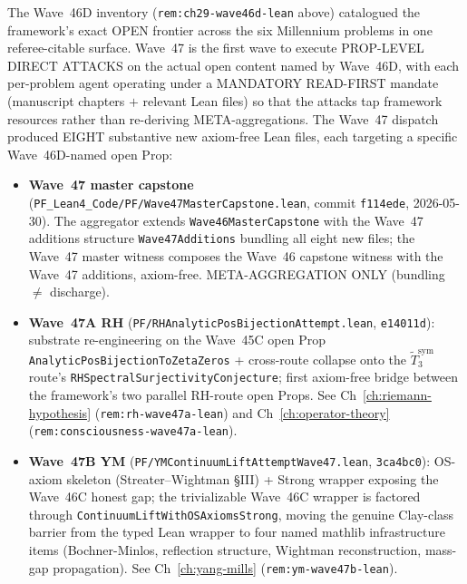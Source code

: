 \begin{remark}\label{rem:ch29-wave47-lean}
The Wave~46D inventory (\texttt{rem:ch29-wave46d-lean} above) catalogued the framework's exact OPEN frontier across the six Millennium problems in one referee-citable surface. Wave~47 is the first wave to execute PROP-LEVEL DIRECT ATTACKS on the actual open content named by Wave~46D, with each per-problem agent operating under a MANDATORY READ-FIRST mandate (manuscript chapters $+$ relevant Lean files) so that the attacks tap framework resources rather than re-deriving META-aggregations. The Wave~47 dispatch produced EIGHT substantive new axiom-free Lean files, each targeting a specific Wave~46D-named open Prop:
\begin{itemize}
  \item \textbf{Wave~47 master capstone} (\texttt{PF\_Lean4\_Code/PF/Wave47MasterCapstone.lean}, commit \texttt{f114ede}, 2026-05-30). The aggregator extends \texttt{Wave46MasterCapstone} with the Wave~47 additions structure \texttt{Wave47Additions} bundling all eight new files; the Wave~47 master witness composes the Wave~46 capstone witness with the Wave~47 additions, axiom-free. META-AGGREGATION ONLY (bundling $\neq$ discharge).
  \item \textbf{Wave~47A RH} (\texttt{PF/RHAnalyticPosBijectionAttempt.lean}, \texttt{e14011d}): substrate re-engineering on the Wave~45C open Prop \texttt{AnalyticPosBijectionToZetaZeros} + cross-route collapse onto the $\widetilde{T}_3^{\mathrm{sym}}$ route's \texttt{RHSpectralSurjectivityConjecture}; first axiom-free bridge between the framework's two parallel RH-route open Props. See Ch~\ref{ch:riemann-hypothesis} (\texttt{rem:rh-wave47a-lean}) and Ch~\ref{ch:operator-theory} (\texttt{rem:consciousness-wave47a-lean}).
  \item \textbf{Wave~47B YM} (\texttt{PF/YMContinuumLiftAttemptWave47.lean}, \texttt{3ca4bc0}): OS-axiom skeleton (Streater--Wightman \S III) + Strong wrapper exposing the Wave~46C honest gap; the trivializable Wave~46C wrapper is factored through \texttt{ContinuumLiftWithOSAxiomsStrong}, moving the genuine Clay-class barrier from the typed Lean wrapper to four named mathlib infrastructure items (Bochner-Minlos, reflection structure, Wightman reconstruction, mass-gap propagation). See Ch~\ref{ch:yang-mills} (\texttt{rem:ym-wave47b-lean}).

\end{itemize}
\end{remark}
